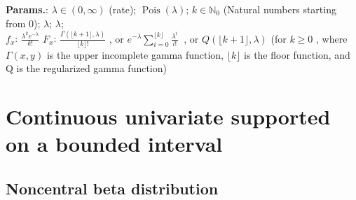     {\color{darkblue} \textbf{Params.}:} {$\lambda\in (0, \infty) $ (rate)}; {$\operatorname{Pois}(\lambda)$}; {$k \in \mathbb{N}_0$ (Natural numbers starting from 0)}; {$\lambda$}; {$\lambda$};\hspace{0.5cm}\\{\color{darkblue} \textbf{$f_x$}:} {$\frac{\lambda^k e^{-\lambda}}{k!}$}{\color{darkblue} \textbf{$F_x$}:} {$\frac{\Gamma(\lfloor k+1\rfloor, \lambda)}{\lfloor k\rfloor !}$ , or $e^{-\lambda} \sum_{i=0}^{\lfloor k\rfloor} \frac{\lambda^i}{i!}\ $ , or $Q(\lfloor k+1\rfloor,\lambda)$ (for $k\ge 0$ , where $\Gamma(x, y)$ is the upper incomplete gamma function, $\lfloor k\rfloor$ is the floor function, and Q is the regularized gamma function)}



    


    \section{Continuous univariate supported on a bounded interval}
        

        
    
        
\subsection{Noncentral beta distribution}





